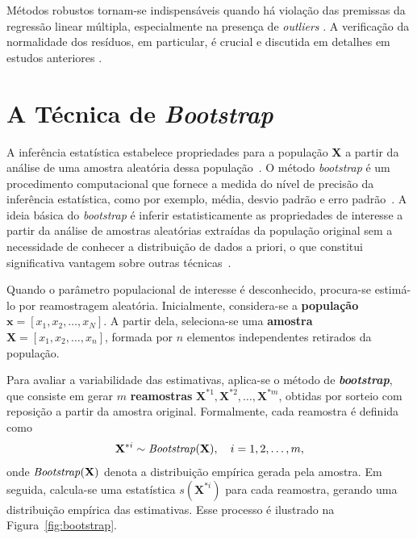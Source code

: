 Métodos robustos tornam-se indispensáveis quando há violação das premissas da regressão linear múltipla, especialmente na presença de \textit{outliers} \cite{Alin2017,Filzmoser2013}. A verificação da normalidade dos resíduos, em particular, é crucial e discutida em detalhes em estudos anteriores \cite{Alin2017,Filzmoser2013}.


\section{A Técnica de \textit{Bootstrap}}
A inferência estatística estabelece propriedades para a população \textbf{X} a partir da análise
de uma amostra aleatória dessa população~\cite{DRAPER:1998,JOHNSON:2001,CHATTERJEE:2006}. O método \textit{bootstrap} é um procedimento computacional que fornece a medida do nível de precisão da inferência estatística, como por exemplo, média, desvio padrão e erro padrão~\cite{yeon2023,alfons2022,wan2023,du2024,jensen2024}. A ideia básica do \textit{bootstrap} é inferir estatisticamente as propriedades de interesse a partir da análise de amostras aleatórias extraídas da população original sem a necessidade de conhecer a distribuição de dados a priori, o que constitui significativa vantagem sobre outras técnicas~\cite{HARDLE:2007,TIMM:2002}.

Quando o parâmetro populacional de interesse é desconhecido, procura-se estimá-lo por
reamostragem aleatória. Inicialmente, considera-se a \textbf{população} 
$\mathbf{x} = [x_1, x_2, \ldots, x_N]$. A partir dela, seleciona-se uma 
\textbf{amostra} $\mathbf{X} = [x_1, x_2, \ldots, x_n]$, formada por $n$ elementos 
independentes retirados da população. 

Para avaliar a variabilidade das estimativas, aplica-se o método de \textbf{\textit{bootstrap}}, que consiste em gerar $m$ \textbf{reamostras} 
$\mathbf{X}^{*1}, \mathbf{X}^{*2}, \ldots, \mathbf{X}^{*m}$, obtidas por sorteio com reposição a partir da amostra original. Formalmente, cada reamostra é definida como
\[
\mathbf{X}^{*i} \sim \text{\textit{Bootstrap}}(\mathbf{X}), \quad i = 1,2,\ldots,m,
\]
onde $\text{\textit{Bootstrap}}(\mathbf{X})$ denota a distribuição empírica gerada pela amostra. 
Em seguida, calcula-se uma estatística $s(\mathbf{X}^{*i})$ para cada reamostra, 
gerando uma distribuição empírica das estimativas. Esse processo é ilustrado 
na Figura~\ref{fig:bootstrap}.

